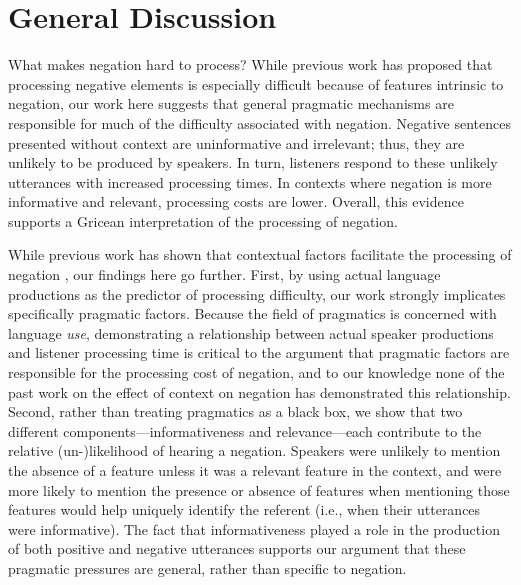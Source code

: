 \documentclass[man, noapacite]{apa2}
\begin{document}
\section{General Discussion}

What makes negation hard to process? While previous work has proposed that processing negative elements is especially difficult because of features intrinsic to negation, our work here suggests that general pragmatic mechanisms are responsible for much of the difficulty associated with negation. Negative sentences presented without context are uninformative and irrelevant; thus, they are unlikely to be produced by speakers. In turn, listeners respond to these unlikely utterances with increased processing times. In contexts where negation is more informative and relevant, processing costs are lower. Overall, this evidence supports a Gricean interpretation of the processing of negation.

While previous work has shown that contextual factors facilitate the processing of negation \cite{wason1965,nieuwland2008,dale2011,orenes2014}, our findings here go further. First, by using actual language productions as the predictor of processing difficulty, our work strongly implicates specifically pragmatic factors. Because the field of pragmatics is concerned with language \emph{use}, demonstrating a relationship between actual speaker productions and listener processing time is critical to the argument that pragmatic factors are responsible for the processing cost of negation, and to our knowledge none of the past work on the effect of context on negation has demonstrated this relationship. Second, rather than treating pragmatics as a black box, we show that two different components---informativeness and relevance---each contribute to the relative (un-)likelihood of hearing a negation. Speakers were unlikely to mention the absence of a feature unless it was a relevant feature in the context, and were more likely to mention the presence or absence of features when mentioning those features would help uniquely identify the referent (i.e., when their utterances were informative). The fact that informativeness played a role in the production of both positive and negative utterances supports our argument that these pragmatic pressures are general, rather than specific to negation.
\end{document}
